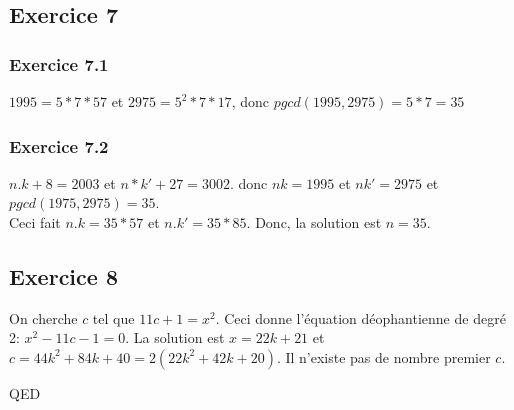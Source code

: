 \documentclass[]{book}
\theoremstyle{definition}
\begin{document}
\subsection*{Exercice 7}
\subsubsection*{Exercice 7.1}
$1995 = 5*7*57$ et $2975 = 5^2*7*17$, donc $pgcd(1995,2975) = 5*7 = 35$

\subsubsection*{Exercice 7.2}
$n.k+8 = 2003$ et $n*k' + 27 = 3002$. donc $nk=1995$ et $nk'=2975$ et $pgcd(1975,2975) = 35$.\\
Ceci fait $n.k=35*57$ et $n.k'=35*85$. Donc, la solution est $n=35$.  	
 

\subsection*{Exercice 8}
On cherche $c$ tel que $11c+1 = x^2$. Ceci donne l'\'equation d\'eophantienne de degr\'e 2: $x^2 -11c-1 = 0$.
La solution est $x=22k+21$ et $c=44k^2+84k+40=2(22k^2+42k+20)$. 
Il n'existe pas de nombre premier $c$.

QED
\end{document}
